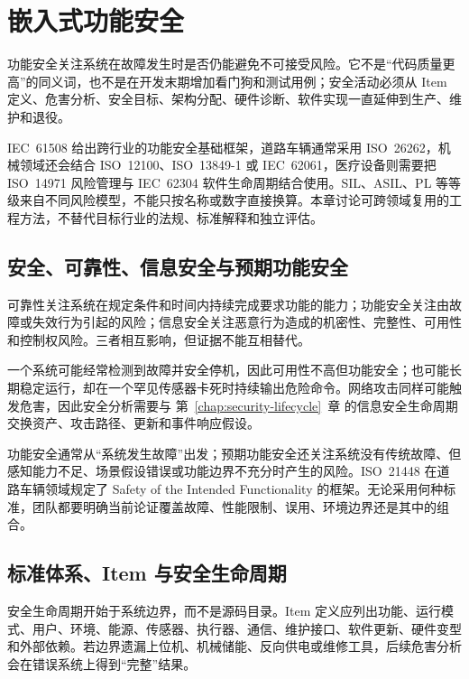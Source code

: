 \chapter{嵌入式功能安全}
\label{chap:functional-safety}

功能安全关注系统在故障发生时是否仍能避免不可接受风险。它不是“代码质量更高”的同义词，也不是在开发末期增加看门狗和测试用例；安全活动必须从 Item 定义、危害分析、安全目标、架构分配、硬件诊断、软件实现一直延伸到生产、维护和退役。

IEC~61508 给出跨行业的功能安全基础框架，道路车辆通常采用 ISO~26262，机械领域还会结合 ISO~12100、ISO~13849-1 或 IEC~62061，医疗设备则需要把 ISO~14971 风险管理与 IEC~62304 软件生命周期结合使用\cite{iec61508,iso26262,iso12100,iso13849-1,iec62061,iso14971,iec62304}。SIL、ASIL、PL 等等级来自不同风险模型，不能只按名称或数字直接换算。本章讨论可跨领域复用的工程方法，不替代目标行业的法规、标准解释和独立评估。

\section{安全、可靠性、信息安全与预期功能安全}

可靠性关注系统在规定条件和时间内持续完成要求功能的能力；功能安全关注由故障或失效行为引起的风险；信息安全关注恶意行为造成的机密性、完整性、可用性和控制权风险。三者相互影响，但证据不能互相替代。

一个系统可能经常检测到故障并安全停机，因此可用性不高但功能安全；也可能长期稳定运行，却在一个罕见传感器卡死时持续输出危险命令。网络攻击同样可能触发危害，因此安全分析需要与 \mbox{第~\ref{chap:security-lifecycle}~章} 的信息安全生命周期交换资产、攻击路径、更新和事件响应假设。

功能安全通常从“系统发生故障”出发；预期功能安全还关注系统没有传统故障、但感知能力不足、场景假设错误或功能边界不充分时产生的风险。ISO~21448 在道路车辆领域规定了 Safety of the Intended Functionality 的框架\cite{iso21448}。无论采用何种标准，团队都要明确当前论证覆盖故障、性能限制、误用、环境边界还是其中的组合。

\section{标准体系、Item 与安全生命周期}

安全生命周期开始于系统边界，而不是源码目录。Item 定义应列出功能、运行模式、用户、环境、能源、传感器、执行器、通信、维护接口、软件更新、硬件变型和外部依赖。若边界遗漏上位机、机械储能、反向供电或维修工具，后续危害分析会在错误系统上得到“完整”结果。

